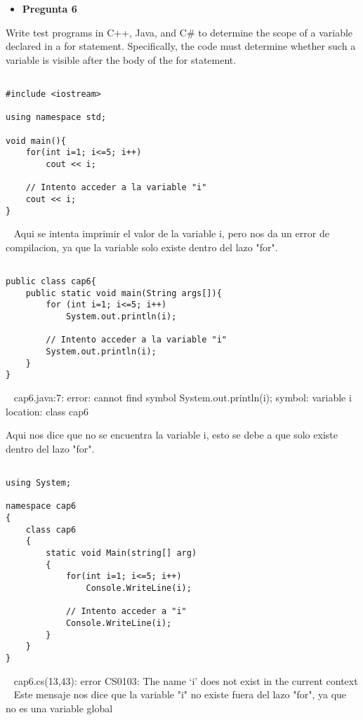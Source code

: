 \documentclass[../main.tex]{subfiles}
\begin{document}
\begin{itemize}
	\item \textbf{Pregunta 6}
\end{itemize}
	Write test programs in C++, Java, and C\# to determine the scope of
	a variable declared in a for statement. Specifically, the code must
	determine whether such a variable is visible after the body of the for
	statement.\newline

\begin{lstlisting}[belowcaptionskip=.5em,caption={C\'odigo en lenguaje C++.}]
	
#include <iostream>

using namespace std;

void main(){
    for(int i=1; i<=5; i++)
        cout << i;
        
    // Intento acceder a la variable "i"
    cout << i;
}
\end{lstlisting}
~\newline
Aqui se intenta imprimir el valor de la variable i, pero nos da un error de compilacion,
ya que la variable solo existe dentro del lazo "for".

\begin{lstlisting}[belowcaptionskip=.5em,caption={C\'odigo en lenguaje Java.}]
	
public class cap6{
    public static void main(String args[]){
        for (int i=1; i<=5; i++)
            System.out.println(i);

        // Intento acceder a la variable "i"
        System.out.println(i);
    }
}
\end{lstlisting}
~\newline
cap6.java:7: error: cannot find symbol System.out.println(i);
  symbol:   variable i
  location: class cap6
  
  Aqui nos dice que no se encuentra la variable i, esto se debe a que solo existe dentro del lazo "for".

\begin{lstlisting}[belowcaptionskip=.5em,caption={C\'odigo en lenguaje C\#.}]
	
using System;

namespace cap6
{
    class cap6
    {
        static void Main(string[] arg)
        {
            for(int i=1; i<=5; i++)
                Console.WriteLine(i);

            // Intento acceder a "i"
            Console.WriteLine(i);
        }
    }
}

\end{lstlisting}
~\newline
cap6.cs(13,43): error CS0103: The name `i' does not exist in the current context
~\newline
Este mensaje nos dice que la variable "i" no existe fuera del lazo "for", ya que no es una variable global
\clearpage
\end{document}
